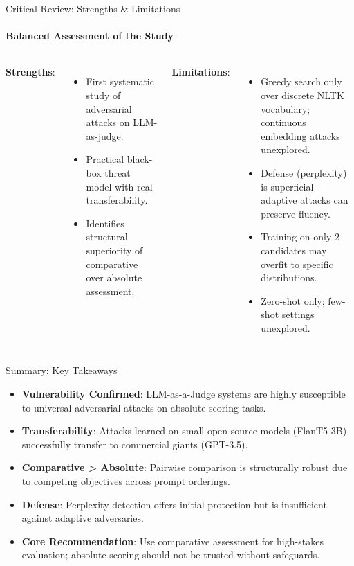 \documentclass[10pt]{beamer}
\begin{document}
	\begin{frame}{Critical Review: Strengths \& Limitations}
		\framesubtitle{Balanced Assessment of the Study}
		\begin{columns}
			\textbf{Strengths}:
			\begin{itemize}
				\item First systematic study of adversarial attacks on LLM-as-judge.
				\item Practical black-box threat model with real transferability.
				\item Identifies structural superiority of comparative over absolute assessment.
			\end{itemize}
			\textbf{Limitations}:
			\begin{itemize}
				\item Greedy search only over discrete NLTK vocabulary; continuous embedding attacks unexplored.
				\item Defense (perplexity) is superficial --- adaptive attacks can preserve fluency.
				\item Training on only 2 candidates may overfit to specific distributions.
				\item Zero-shot only; few-shot settings unexplored.
			\end{itemize}
		\end{columns}
	\end{frame}
	
	\begin{frame}{Summary: Key Takeaways}
		\begin{itemize}
			\item \textbf{Vulnerability Confirmed}: LLM-as-a-Judge systems are highly susceptible to universal adversarial attacks on absolute scoring tasks.
			\vspace{0.25cm}
			\item \textbf{Transferability}: Attacks learned on small open-source models (FlanT5-3B) successfully transfer to commercial giants (GPT-3.5).
			\vspace{0.25cm}
			\item \textbf{Comparative > Absolute}: Pairwise comparison is structurally robust due to competing objectives across prompt orderings.
			\vspace{0.25cm}
			\item \textbf{Defense}: Perplexity detection offers initial protection but is insufficient against adaptive adversaries.
			\vspace{0.25cm}
			\item \textbf{Core Recommendation}: Use comparative assessment for high-stakes evaluation; absolute scoring should not be trusted without safeguards.
		\end{itemize}
	\end{frame}
	
\end{document}
